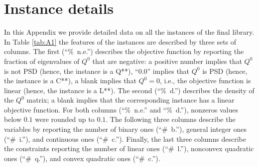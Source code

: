 
\section{Instance details}\label{sec:instance_details}


In this Appendix we provide detailed data on all the instances of the final library. 
In Table \ref{tab:A1} the features of the instances are described by three sets of columns. The first (``\%~n.e.'') describes the objective function by reporting the fraction of eigenvalues of $Q^0$ that are negative: a positive number implies that $Q^0$ is not PSD (hence, the instance is a Q**), ``0.0'' implies that $Q^0$ is PSD (hence, the instance is a C**), a blank implies that $Q^0 = 0$, i.e., the objective function is linear (hence, the instance is a L**). 
The second (``\%~d.'') describes the density of the $Q^0$ matrix; a blank implies that the corresponding instance has a linear objective function.
For both columns (``\%~n.e.'' and ``\%~d.''), nonzeros values below $0.1$ were rounded up to $0.1$.
The following three columns describe the variables by reporting the number of binary ones (``\#~b.''), general integer ones (``\#~i.''), and continuous ones (``\#~c.''). Finally, the last three columns describe the constraints reporting the number of linear ones (``\#~l.''), nonconvex quadratic ones (``\#~q.''), and convex quadratic ones (``\#~c.''). 



